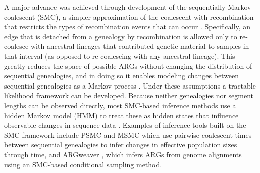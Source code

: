 \documentclass[11pt]{article}
\begin{document}
A major advance was achieved through development of the sequentially Markov 
coalescent (SMC), a simpler approximation of the coalescent with recombination
that restricts the types of recombination events that can occur 
\citep{mcvean2005approximating}. Specifically,
an edge that is detached from a genealogy by recombination is allowed only to
re-coalesce with ancestral lineages that contributed genetic material to samples
in that interval (as opposed to re-coalescing with any ancestral lineage). 
This greatly reduces the space of possible ARGs without changing the
distribution of sequential genealogies, and in doing so it enables modeling
changes between sequential genealogies
as a Markov process \citep{mcvean2005approximating}. 
Under these assumptions a tractable likelihood framework can be developed. 
Because neither genealogies nor segment lengths can
be observed directly, most SMC-based inference methods use 
a hidden Markov model (HMM) to treat these as hidden states 
that influence observable changes in sequence data \citep{spence_inference_2018}.
Examples of inference tools built on the SMC framework include 
PSMC \citep{li2011inference} and MSMC \citep{schiffels_inferring_2014}
which use pairwise coalescent times between sequential genealogies
to infer changes in effective population sizes through time, 
and ARGweaver \citep{rasmussen2014genome, hubisz2020inference}, 
which infers ARGs from genome alignments using an SMC-based 
conditional sampling method.
\end{document}
